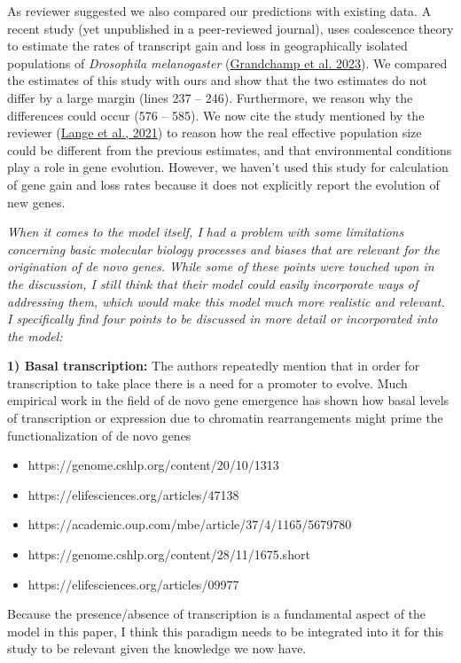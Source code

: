 \documentclass[12pt,a4paper]{article}
\begin{document}
As reviewer suggested we also compared our predictions with existing data. A recent study (yet unpublished in a peer-reviewed journal), uses coalescence theory to estimate the rates of transcript gain and loss in geographically isolated populations of \textit{Drosophila melanogaster} (\href{https://doi.org/10.1101/2023.02.13.528330}{Grandchamp et al. 2023}). We compared the estimates of this study with ours and show that the two estimates do not differ by a large margin (lines 237 -- 246). Furthermore, we reason why the differences could occur (576 -- 585). We now cite the study mentioned by the reviewer (\href{https://doi.org/10.1093/molbev/msab368}{Lange et al., 2021}) to reason how the real effective population size could be different from the previous estimates, and that environmental conditions play a role in gene evolution. However, we haven't used this study for calculation of gene gain and loss rates because it does not explicitly report the evolution of new genes.


{\itshape When it comes to the model itself, I had a problem with some limitations concerning basic molecular biology processes and biases that are relevant for the origination of de novo genes. While some of these points were touched upon in the discussion, I still think that their model could easily incorporate ways of addressing them, which would make this model much more realistic and relevant. I specifically find four points to be discussed in more detail or incorporated into the model:



\textbf{1) Basal transcription:} The authors repeatedly mention that in order for transcription to take place there is a need for a promoter to evolve. Much empirical work in the field of de novo gene emergence has shown how basal levels of transcription or expression due to chromatin rearrangements might prime the functionalization of de novo genes 

\begin{itemize}\setlength{\itemsep}{-5pt}
\item https://genome.cshlp.org/content/20/10/1313
\item https://elifesciences.org/articles/47138
\item https://academic.oup.com/mbe/article/37/4/1165/5679780
\item https://genome.cshlp.org/content/28/11/1675.short
\item https://elifesciences.org/articles/09977
\end{itemize}

Because the presence/absence of transcription is a fundamental aspect of the model in this paper, I think this paradigm needs to be integrated into it for this study to be relevant given the knowledge we now have.
}
\end{document}
